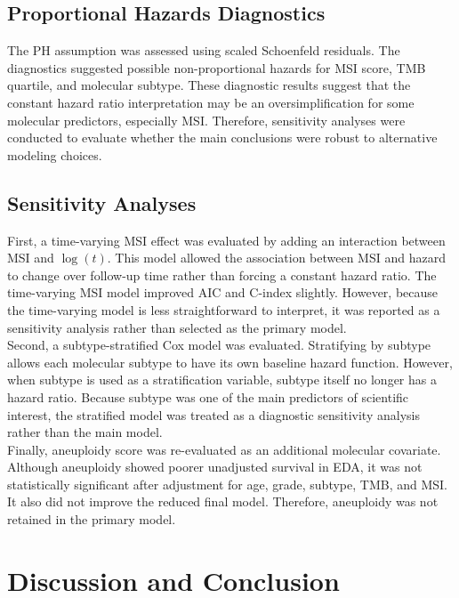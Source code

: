 \documentclass[paper=a4, fontsize=11pt]{scrartcl}
\numberwithin{equation}{section}		%
\numberwithin{figure}{section}			%
\numberwithin{table}{section}				%
\begin{document}
\subsection{Proportional Hazards Diagnostics} 

The PH assumption was assessed using scaled Schoenfeld residuals. The diagnostics suggested possible non-proportional hazards for MSI score, TMB quartile, and molecular subtype. These diagnostic results suggest that the constant hazard ratio interpretation may be an oversimplification for some molecular predictors, especially MSI. Therefore, sensitivity analyses were conducted to evaluate whether the main conclusions were robust to alternative modeling choices. 

\subsection{Sensitivity Analyses}

First, a time-varying MSI effect was evaluated by adding an interaction between MSI and $\log(t)$. This model allowed the association between MSI and hazard to change over follow-up time rather than forcing a constant hazard ratio. The time-varying MSI model improved AIC and C-index slightly. However, because the time-varying model is less straightforward to interpret, it was reported as a sensitivity analysis rather than selected as the primary model. \\

\noindent
Second, a subtype-stratified Cox model was evaluated. Stratifying by subtype allows each molecular subtype to have its own baseline hazard function. However, when subtype is used as a stratification variable, subtype itself no longer has a hazard ratio. Because subtype was one of the main predictors of scientific interest, the stratified model was treated as a diagnostic sensitivity analysis rather than the main model. \\

\noindent
Finally, aneuploidy score was re-evaluated as an additional molecular covariate. Although aneuploidy showed poorer unadjusted survival in EDA, it was not statistically significant after adjustment for age, grade, subtype, TMB, and MSI. It also did not improve the reduced final model. Therefore, aneuploidy was not retained in the primary model. 

\section{Discussion and Conclusion}
\end{document}
